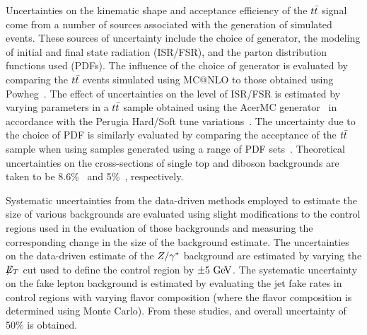 Uncertainties on the kinematic shape and acceptance efficiency of the $t\bar{t}$ signal
come from a number of sources associated with the generation of simulated events.
These sources of uncertainty include the choice of generator, the modeling of
initial and final state radiation (ISR/FSR), and the parton distribution
functions used (PDFs).
The influence of the choice of generator is evaluated by comparing the $t\bar{t}$ 
events simulated using {\sc MC@NLO} to those obtained using {\sc Powheg}~\cite{powheg,Frixione:2007vw,Alioli:2010xd}.
The effect of uncertainties on the level of ISR/FSR is estimated by varying
parameters in a $t\bar{t}$ sample obtained using the {\sc AcerMC} generator~\cite{Acer}
in accordance with the Perugia Hard/Soft tune variations~\cite{Skands}.
The uncertainty due to the choice of PDF is similarly evaluated by comparing the acceptance
of the $t\bar{t}$ sample when using samples generated using a range of PDF sets~\cite{Pumplin:2002vw}.
Theoretical uncertainties on the cross-sections of single top and diboson
backgrounds are taken to be 8.6\%~\cite{PhysRevD.83.091503} and 5\%~\cite{Campbell:2010ff},
respectively.

%

Systematic uncertainties from the data-driven methods employed to estimate the size
of various backgrounds are evaluated using slight modifications to the control
regions used in the evaluation of those backgrounds and measuring the corresponding
change in the size of the background estimate.
The uncertainties on the data-driven estimate of the $Z/\gamma^{*}$ background
are estimated by varying the $\not\!\!{E_{T}}$ cut used to define the control
region by $\pm 5\GeV$.
The systematic uncertainty on the fake lepton background is estimated by evaluating
the jet fake rates in control regions with varying flavor composition (where the
flavor composition is determined using Monte Carlo).
From these studies, and overall uncertainty of 50\% is obtained.

